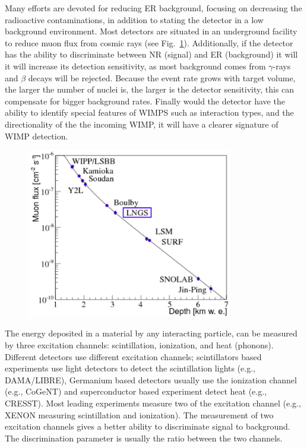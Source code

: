 Many efforts are devoted for reducing ER background, focusing on decreasing the radioactive contaminations, in addition to stating the detector in a low background environment. Most detectors are situated in an underground facility to reduce muon flux from cosmic rays (see Fig.~\ref{fig:MuonRed}). Additionally, if the detector has the ability to discriminate between NR (signal) and ER (background) it will it will increase its detection sensitivity, as most background comes from $\gamma$-rays and $\beta$ decays will be rejected. Because the event rate grows with target volume, the larger the number of nuclei is, the larger is the detector sensitivity, this can compensate for bigger background rates. Finally would the detector have the ability to identify special features of WIMPS such as interaction types, and the directionality of the the incoming WIMP, it will have a clearer signature of WIMP detection.

\begin{figure}[]
	\centering
	\includegraphics[width=0.8\textwidth]{figs/muones.png}
	\label{fig:MuonRed}
\end{figure}

The energy deposited in a material by any interacting particle, can be measured by three excitation channels: scintillation, ionization, and heat (phonons). Different detectors use different excitation channels; scintillators based experiments use light detectors to detect the scintillation lights (e.g., DAMA/LIBRE), Germanium based detectors usually use the ionization channel (e.g., CoGeNT) and superconductor based experiment detect heat (e.g., CRESST). Most leading experiments measure two of the excitation channel (e.g., XENON measuring scintillation and ionization). The measurement of two excitation channels gives a better ability to discriminate signal to background. The discrimination parameter is usually the ratio between the two channels.  

